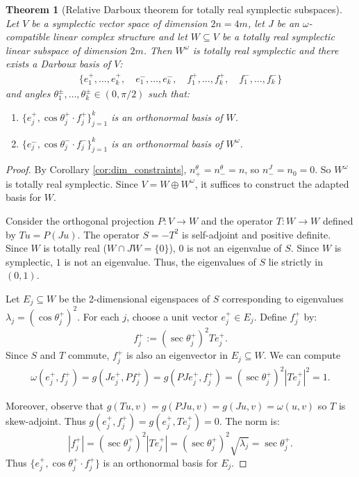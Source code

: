 \documentclass[12pt, final]{article}
\newtheorem{theorem}{Theorem}[section]
\begin{document}
\begin{theorem}[Relative Darboux theorem for totally real symplectic subspaces] \label{thm:totally_real_darboux}
Let $V$ be a symplectic vector space of dimension $2n = 4m$, let $J$ be an $\omega$-compatible linear complex structure and let $W \subseteq V$ be a totally real symplectic linear subspace of dimension $2m$. Then $W^\omega$ is totally real symplectic and there exists a Darboux basis of $V$:
\begin{align*}
\{e_1^+, \dots, e_{k}^+, \quad e_1^{-}, \dots, e_{k}^{-}, \quad f_1^+, \dots, f_{k}^+, \quad f_1^-, \dots, f_{k}^-\}
\end{align*}
and angles $\theta^\pm_1, \dots, \theta^\pm_k \in (0, \pi/2)$ such that:
\begin{enumerate}
    \item $\{ e^+_j, \cos \theta^+_j \cdot f_j^+\}_{j = 1}^k$ is an orthonormal basis of $W$.
    \item $\{e_j^-, \cos \theta^-_j \cdot f^-_j\}_{j = 1}^k$ is an orthonormal basis of $W^\omega$.
\end{enumerate}
\end{theorem}

\begin{proof}
By Corollary \ref{cor:dim_constraints}, $n_+^\theta = n_-^\theta = n$, so $n_-^J = n_0 = 0$. So $W^\omega$ is totally real symplectic. Since $V = W \oplus W^\omega$, it suffices to construct the adapted basis for $W$.

Consider the orthogonal projection $P: V \to W$ and the operator $T: W \to W$ defined by $Tu = P(Ju)$.  The operator $S = -T^2$ is self-adjoint and positive definite. Since $W$ is totally real ($W \cap JW = \{0\}$), $0$ is not an eigenvalue of $S$. Since $W$ is symplectic, $1$ is not an eigenvalue. Thus, the eigenvalues of $S$ lie strictly in $(0, 1)$.

Let $E_j \subseteq W$ be the 2-dimensional eigenspaces of $S$ corresponding to eigenvalues $\lambda_j = (\cos \theta^+_j)^2$. For each $j$, choose a unit vector $e_j^+ \in E_j$. Define $f_j^+$ by:
\[ f_j^+ := (\sec \theta^+_j)^2 T e_j^+. \]
Since $S$ and $T$ commute, $f_j^+$ is also an eigenvector in $E_j \subseteq W$. We can compute  \begin{align*} \omega(e_j^+, f_j^+) =   g(J e_{j}^+, Pf_j^+) = g(PJe_{j}^+, f_j^+)= (\sec \theta^+_j)^2 |Te_j^+|^2 = 1. \end{align*}

Moreover, observe that $g(Tu, v) = g(PJu, v) = g(Ju, v) = \omega(u, v)$ so $T$ is skew-adjoint.
Thus $g(e_j^+, f_j^+) = g(e_j^+, T e_j^+) = 0$. The norm is:
    \[ |f_j^+| = (\sec \theta^+_j)^2 |T e_j^+| = (\sec \theta^+_j)^2 \sqrt{\lambda_j} = \sec \theta^+_j. \]
Thus $\{e_j^+, \cos \theta^+_j \cdot f_j^+\}$ is an orthonormal basis for $E_j$.
\end{proof}
\end{document}
